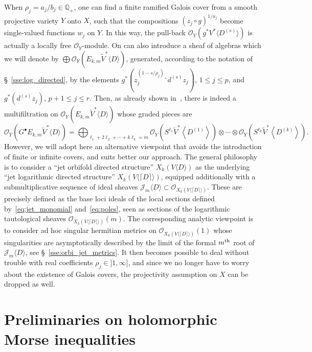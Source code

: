 \documentclass[AHL,Unicode,longabstracts,published]{cedram}
\newcommand*\cJ{\mathcal{J}}
\newcommand*\cO{\mathcal{O}}
\newcommand*\bQ{\mathbb{Q}}
\let\leq\leqslant
\begin{document}
\begin{rema}\label{rema:q_coefficients}
When $\rho_j=a_j/b_j\in\bQ_+$, one can find a finite ramified Galois cover
 from a smooth projective variety $Y$ onto $X$, such that the compositions $(z_j\circ g)^{1/a_j}$ become single-valued functions
$w_j$ on $Y$. In this way, the pull-back $\cO_Y(g^*V^*\langle D^{(s)}\rangle)$ is actually a locally free $\cO_Y$-module. On can also introduce a sheaf of algebras which we will denote by $\bigoplus\cO_Y(E_{k,m}\widetilde V^*\langle D\rangle)$, generated, according to the notation of \S~\ref{sse:log_directed}, by the elements $g^*(z_j^{(1-s/\rho_j)_+}d^{(s)}z_j)$, $1\leq j\leq p$, and
$g^*(d^{(s)}z_j)$, $p+1\leq j\leq r$. Then, as already shown in~\cite{CDR20}, there is indeed a multifiltration on
$\cO_Y(E_{k,m}\widetilde V^*\langle D\rangle)$ whose graded pieces are
\[
\cO_Y\left(G^\bullet E_{k,m}\widetilde V^*\langle D\rangle\right)=
\bigoplus_{\ell_1+2\ell_2+\cdots+k\ell_k=m}
\cO_Y\left(S^{\ell_1}\widetilde V^*\left\langle D^{(1)}\right\rangle\right)\otimes \cdots
\otimes\cO_Y\left(S^{\ell_k}\widetilde V^*\left\langle D^{(k)}\right\rangle\right).
\]
However, we will adopt here an alternative viewpoint that avoids the introduction of finite or infinite covers, and suits better our approach. The general philosophy is to consider a ``jet orbifold directed structure'' $X_k(V\langle D\rangle)$ as the underlying ``jet logarithmic directed structure'' $X_k(V\langle\lceil D\rceil\rangle)$, equipped additionally with a submultiplicative sequence of ideal sheaves
$\cJ_m\langle D\rangle\subset \cO_{X_k(V\langle\lceil D\rceil\rangle)}$. These are precisely defined as the base loci ideals of the local sections defined by~\eqref{eq:jet_monomial} and~\eqref{eq:poles}, seen as sections of the logarithmic tautological sheaves
$\cO_{X_k(V\langle\lceil D\rceil\rangle)}(m)$. The corresponding analytic viewpoint is to consider ad hoc singular hermitian metrics on $\cO_{X_k(V\langle\lceil D\rceil\rangle)}(1)$ whose singularities are asymptotically described by the limit of the formal $m^{\rm th}$ root of $\cJ_m\langle D\rangle$, see \S~\ref{sse:orbi_jet_metrics}. It then becomes possible to deal without trouble with real coefficients $\rho_j\in{}]1,\infty]$, and since we no longer have to worry about the existence of Galois covers, the projectivity assumption on $X$ can be dropped as well.
\end{rema}

\section{Preliminaries on holomorphic Morse inequalities}\label{se:Morse}
\end{document}
